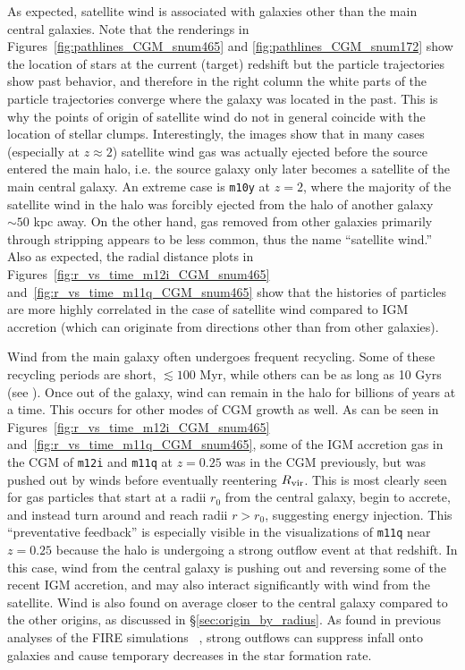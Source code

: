 \documentclass[fleqn,usenatbib]{mnras}
\begin{document}
As expected, satellite wind is associated with galaxies other than the main central galaxies. 
Note that the renderings in Figures~\ref{fig:pathlines_CGM_snum465} and \ref{fig:pathlines_CGM_snum172} show the location of stars at the current (target) redshift but the particle trajectories show past behavior, and therefore in the right column the white parts of the particle trajectories converge where the galaxy was located in the past. 
This is why the points of origin of satellite wind do not in general coincide with the location of stellar clumps. 
Interestingly, the images show that in many cases (especially at $z\approx 2$) satellite wind gas was actually ejected before the source entered the main halo, i.e. the source galaxy only later becomes a satellite of the main central galaxy. 
An extreme case is \texttt{m10y} at $z=2$, where the majority of the satellite wind in the halo was forcibly ejected from the halo of another galaxy $\sim 50$ kpc away.
On the other hand, gas removed from other galaxies primarily through stripping appears to be less common, thus the name ``satellite wind.''
Also as expected, the radial distance plots in Figures~\ref{fig:r_vs_time_m12i_CGM_snum465} and~\ref{fig:r_vs_time_m11q_CGM_snum465} show that the histories of particles are more highly correlated in the case of satellite wind compared to IGM accretion (which can originate from directions other than from other galaxies). 

Wind from the main galaxy often undergoes frequent recycling.
Some of these recycling periods are short, $\lesssim 100$ Myr, while others can be as long as 10 Gyrs (see \citealt{Angles-Alcazar2017}).
Once out of the galaxy, wind can remain in the halo for billions of years at a time.
This occurs for other modes of CGM growth as well.
As can be seen in Figures~\ref{fig:r_vs_time_m12i_CGM_snum465} and~\ref{fig:r_vs_time_m11q_CGM_snum465}, some of the IGM accretion gas in the CGM of \texttt{m12i} and \texttt{m11q} at $z=0.25$ was in the CGM previously, but was pushed out by winds before eventually reentering $R_{\rm vir}$.
This is most clearly seen for gas particles that start at a radii $r_0$ from the central galaxy, begin to accrete, and instead turn around and reach radii $r > r_0$, suggesting energy injection.
This ``preventative feedback'' is especially visible in the visualizations of \texttt{m11q} near $z=0.25$ because the halo is undergoing a strong outflow event at that redshift.
In this case, wind from the central galaxy is pushing out and reversing some of the recent IGM accretion, and may also interact significantly with wind from the satellite. 
Wind is also found on average closer to the central galaxy compared to the other origins, as discussed in \S\ref{sec:origin_by_radius}.
As found in previous analyses of the FIRE simulations ~\citep[e.g.][]{Muratov2015,Faucher-Giguere2015}, strong outflows can suppress infall onto galaxies and cause temporary decreases in the star formation rate.
\end{document}
